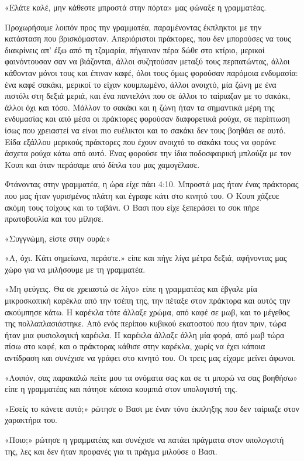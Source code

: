 \documentclass[12pt,twoside, openany]{book}
\begin{document}
«Ελάτε καλέ, μην κάθεστε μπροστά στην πόρτα» μας φώναξε η γραμματέας. 

Προχωρήσαμε λοιπόν προς την γραμματέα, παραμένοντας έκπληκτοι με την κατάσταση που βρισκόμασταν. Απεριόριστοι πράκτορες, που δεν μπορούσες να τους διακρίνεις απ’ έξω από τη τζαμαρία, πήγαιναν πέρα δώθε στο κτίριο, μερικοί φαινόντουσαν σαν να βιάζονται, άλλοι συζητούσαν μεταξύ τους περπατώντας, άλλοι κάθονταν μόνοι τους και έπιναν καφέ, όλοι τους όμως φορούσαν παρόμοια ενδυμασία: ένα καφέ σακάκι, μερικοί το είχαν κουμπωμένο, άλλοι ανοιχτό, μία ζώνη με ένα πιστόλι στη δεξιά μεριά, και ένα παντελόνι που σε άλλοι το ταίριαζαν με το σακάκι, άλλοι όχι και τόσο. Μάλλον το σακάκι και η ζώνη ήταν τα σημαντικά μέρη της ενδυμασίας και από μέσα οι πράκτορες φορούσαν διαφορετικά ρούχα, σε περίπτωση ίσως που χρειαστεί να είναι πιο ευέλικτοι και το σακάκι δεν τους βοηθάει σε αυτό. Είδα εξάλλου μερικούς πράκτορες που έχουν ανοιχτό το σακάκι τους να φοράνε άσχετα ρούχα κάτω από αυτό. Ένας φορούσε την ίδια ποδοσφαιρική μπλούζα με τον Κουπ και όταν περάσαμε από δίπλα του μας χαμογέλασε.

Φτάνοντας στην γραμματέα, η ώρα είχε πάει 4:10. Μπροστά μας ήταν ένας πράκτορας που μας ήταν γυρισμένος πλάτη και έγραφε κάτι στο κινητό του. Ο Κουπ χάζευε ακόμη τους τοίχους και το ταβάνι. Ο Βασι που είχε ξεπεράσει το σοκ πήρε πρωτοβουλία και του μίλησε.

«Συγγνώμη, είστε στην ουρά;»

«Α, όχι. Κάτι σημείωνα, περάστε.» είπε και πήγε λίγα μέτρα δεξιά, αφήνοντας μας χώρο για να μιλήσουμε με τη γραμματέα.

«Μη φεύγεις. Θα σε χρειαστώ σε λίγο» είπε η γραμματέας και έβγαλε μία μικροσκοπική καρέκλα από την τσέπη της, την πέταξε στον πράκτορα και αυτός την ακούμπησε κάτω. Η καρέκλα τότε άλλαξε χρώμα, από καφέ σε μωβ, και το μέγεθος της πολλαπλασιάστηκε. Από ενός περίπου κυβικού εκατοστού που ήταν πριν, τώρα ήταν μια φυσιολογική καρέκλα. Η καρέκλα άλλαξε άλλη μία φορά, από μωβ τώρα πίσω στο καφέ, και ο πράκτορας κάθισε στην καρέκλα, χωρίς να έχει κάποια αντίδραση και συνέχισε να γράφει στο κινητό του. Οι τρεις μας είχαμε μείνει άφωνοι.

«Λοιπόν, σας παρακαλώ πείτε μου τα ονόματα σας και σε τι μπορώ να σας βοηθήσω» είπε η γραμματέας και πάτησε κάποια κουμπιά στον υπολογιστή της.

«Εσείς το κάνετε αυτό;» ρώτησε ο Βασι με έναν τόνο έκπληξης που δεν ταίριαζε στον χαρακτήρα του.

«Ποιο;» ρώτησε η γραμματέας και συνέχισε να πατάει πράγματα στον υπολογιστή της, λες και δεν ήταν προφανές για τι πράγμα μιλούσε ο Βασι.
\end{document}
